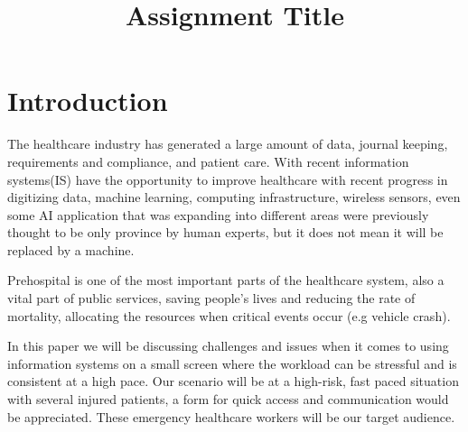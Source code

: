 \documentclass[fleqn,10pt]{wlscirep}
\title{Assignment Title}
\author{}
\begin{document}




\flushbottom
\maketitle
\tableofcontents
\newpage


\section{Introduction}
The healthcare industry has generated a large amount of data, journal keeping, requirements and compliance, and patient care\cite{Kilde3}. With recent information systems(IS) have the opportunity to improve healthcare with recent progress in digitizing data, machine learning, computing infrastructure, wireless sensors, even some AI application that was expanding into different areas were previously thought to be only province by human experts, but it does not mean it will be replaced by a machine\cite{Kilde4}. 

Prehospital is one of the most important parts of the healthcare system, also a vital part of public services, saving people's lives and reducing the rate of mortality, allocating the resources when critical events occur (e.g vehicle crash)\cite{Kilde1}.

In this paper we will be discussing challenges and issues when it comes to using information systems on a small screen where the workload can be stressful and is consistent at a high pace. Our scenario will be at a high-risk, fast paced situation with several injured patients, a form for quick access and communication would be appreciated. These emergency healthcare workers will be our target audience. 
\end{document}
